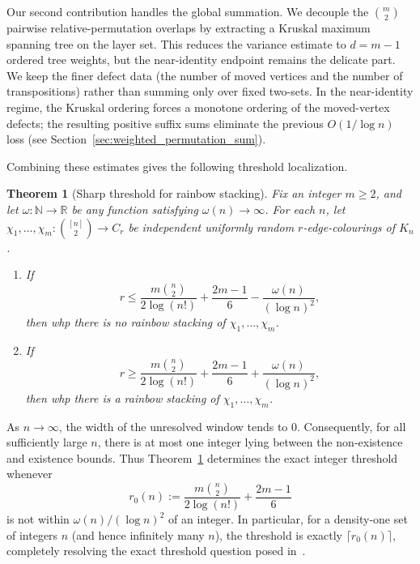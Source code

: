 \documentclass[11pt,reqno]{amsart}
\newtheorem{theorem}{Theorem}[section]
\theoremstyle{definition}
\theoremstyle{remark}
\newcommand\N{\mathbb{N}}
\renewcommand\le{\leqslant}
\renewcommand\ge{\geqslant}
\renewcommand\to{\rightarrow}
\def\R{\mathbb{R}}
\begin{document}
Our second contribution handles the global summation.  We decouple the $\binom m2$ pairwise relative-permutation overlaps by extracting a Kruskal maximum spanning tree on the layer set.  This reduces the variance estimate to $d=m-1$ ordered tree weights, but the near-identity endpoint remains the delicate part.  We keep the finer defect data (the number of moved vertices and the number of transpositions) rather than summing only over fixed two-sets.  In the near-identity regime, the Kruskal ordering forces a monotone ordering of the moved-vertex defects; the resulting positive suffix sums eliminate the previous $O(1/\log n)$ loss (see Section~\ref{sec:weighted_permutation_sum}). 

Combining these estimates gives the following threshold localization.

\begin{theorem}[Sharp threshold for rainbow stacking] \label{thm:main_stacking}
Fix an integer $m \ge 2$, and let $\omega:\N \to \R$ be any function satisfying $\omega(n)\to\infty$. For each $n$, let
$\chi_{1},\dots,\chi_{m} : \binom{[n]}{2} \to C_r$
be independent uniformly random $r$-edge-colourings of $K_{n}$.
\begin{enumerate}
    \item[\rm (a)] If 
    \[ r \le \frac{m\binom{n}{2}}{2\log(n!)} + \frac{2m-1}{6} - \frac{\omega(n)}{(\log n)^{2}}, \]
    then whp there is no rainbow stacking of $\chi_{1},\dots,\chi_{m}$.
    
    \item[\rm (b)] If 
    \[ r \ge \frac{m\binom{n}{2}}{2\log(n!)} + \frac{2m-1}{6} + \frac{\omega(n)}{(\log n)^{2}}, \]
    then whp there is a rainbow stacking of $\chi_{1},\dots,\chi_{m}$.  
\end{enumerate}
\end{theorem}

As $n\to\infty$, the width of the unresolved window tends to $0$. Consequently, for all sufficiently large $n$, there is at most one integer lying between the non-existence and existence bounds. Thus Theorem~\ref{thm:main_stacking} determines the exact integer threshold whenever
\[
r_0(n):=\frac{m\binom{n}{2}}{2\log(n!)}+\frac{2m-1}{6}
\]
is not within $\omega(n)/(\log n)^2$ of an integer. In particular, for a density-one set of integers $n$ (and hence infinitely many $n$), the threshold is exactly $\lceil r_0(n)\rceil$, completely resolving the exact threshold question posed in~\cite{ADK}.
\end{document}
